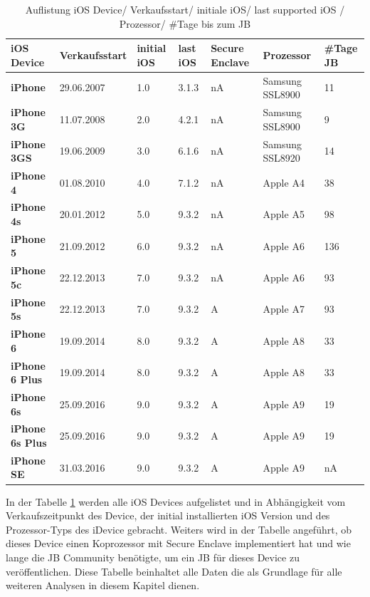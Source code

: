 \begin{table}[htp!]
    \begin{center}
        \begin{tabular}{|p{30mm}|p{27mm}|p{12mm}|p{10mm}|p{18mm}|p{2cm}|p{15mm}|} \hline
            \textbf{iOS Device} & \textbf{Verkaufsstart} & \textbf{initial iOS} & \textbf{last iOS} & \textbf{Secure Enclave} & \textbf{Prozessor}  & \textbf{\#Tage JB} \\ \hline
            \textbf{iPhone} & 29.06.2007  & 1.0 & 3.1.3 & nA & Samsung SSL8900 & 11\\ \hline
            \textbf{iPhone 3G} & 11.07.2008 & 2.0 & 4.2.1 & nA & Samsung SSL8900 & 9\\ \hline
            \textbf{iPhone 3GS} & 19.06.2009 & 3.0 & 6.1.6 & nA & Samsung SSL8920 & 14\\ \hline
            \textbf{iPhone 4} & 01.08.2010 & 4.0 & 7.1.2 & nA & Apple A4 & 38 \\ \hline
            \textbf{iPhone 4s} & 20.01.2012 & 5.0 & 9.3.2 & nA & Apple A5 & 98 \\ \hline 
            \textbf{iPhone 5} & 21.09.2012 & 6.0 &  9.3.2 & nA & Apple A6 & 136 \\ \hline
            \textbf{iPhone 5c} & 22.12.2013 & 7.0 & 9.3.2 & nA & Apple A6 & 93 \\ \hline
            \textbf{iPhone 5s} & 22.12.2013 & 7.0 & 9.3.2 & A & Apple A7 & 93 \\ \hline
            \textbf{iPhone 6} & 19.09.2014 & 8.0 & 9.3.2 & A & Apple A8 & 33\\ \hline
            \textbf{iPhone 6 Plus} & 19.09.2014 & 8.0 & 9.3.2 &  A & Apple A8 & 33\\ \hline
            \textbf{iPhone 6s} & 25.09.2016 & 9.0 &  9.3.2 & A & Apple A9 & 19\\ \hline
            \textbf{iPhone 6s Plus} & 25.09.2016 & 9.0 & 9.3.2 &  A & Apple A9 & 19\\ \hline
            \textbf{iPhone SE} & 31.03.2016 & 9.0 &  9.3.2 & A & Apple A9 & nA\\ \hline  
        \end{tabular} 
        \caption{Auflistung iOS Device/ Verkaufsstart/ initiale iOS/ last supported iOS / Prozessor/ \#Tage bis zum JB}
        \label{tab:iOSHW}
    \end{center}
\end{table}

In der Tabelle \ref{tab:iOSHW} werden alle iOS Devices aufgelistet und  in Abhängigkeit vom Verkaufszeitpunkt des Device, der initial installierten iOS Version und des Prozessor-Typs des iDevice gebracht. Weiters wird in der Tabelle angeführt, ob dieses Device einen Koprozessor mit Secure Enclave implementiert hat und wie lange die JB Community benötigte, um ein JB für dieses Device zu veröffentlichen. Diese Tabelle beinhaltet alle Daten die als Grundlage für alle weiteren Analysen in diesem Kapitel dienen.\par

